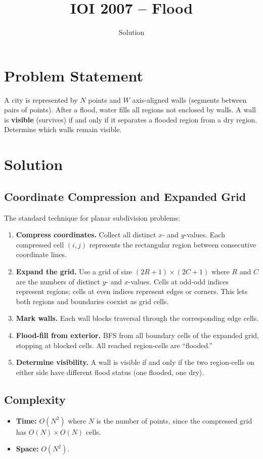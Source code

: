 \documentclass[11pt,a4paper]{article}
\title{IOI 2007 -- Flood}
\author{Solution}
\date{}
\begin{document}
\maketitle

\section{Problem Statement}
A city is represented by $N$ points and $W$ axis-aligned walls (segments between pairs of points). After a flood, water fills all regions not enclosed by walls. A wall is \textbf{visible} (survives) if and only if it separates a flooded region from a dry region. Determine which walls remain visible.

\section{Solution}

\subsection{Coordinate Compression and Expanded Grid}
The standard technique for planar subdivision problems:
\begin{enumerate}
    \item \textbf{Compress coordinates.} Collect all distinct $x$- and $y$-values. Each compressed cell $(i, j)$ represents the rectangular region between consecutive coordinate lines.
    \item \textbf{Expand the grid.} Use a grid of size $(2R+1) \times (2C+1)$ where $R$ and $C$ are the numbers of distinct $y$- and $x$-values. Cells at odd-odd indices represent regions; cells at even indices represent edges or corners. This lets both regions and boundaries coexist as grid cells.
    \item \textbf{Mark walls.} Each wall blocks traversal through the corresponding edge cells.
    \item \textbf{Flood-fill from exterior.} BFS from all boundary cells of the expanded grid, stopping at blocked cells. All reached region-cells are ``flooded.''
    \item \textbf{Determine visibility.} A wall is visible if and only if the two region-cells on either side have different flood status (one flooded, one dry).
\end{enumerate}

\subsection{Complexity}
\begin{itemize}
    \item \textbf{Time:} $O(N^2)$ where $N$ is the number of points, since the compressed grid has $O(N) \times O(N)$ cells.
    \item \textbf{Space:} $O(N^2)$.
\end{itemize}
\end{document}
